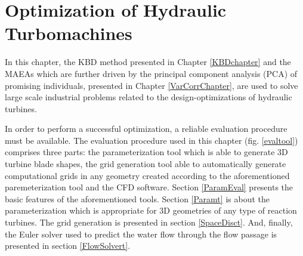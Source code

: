 \ifpdf
    \graphicspath{{5/figures/PNG/}{5/figures/PDF/}{4/figures/}}
\else
    \graphicspath{{5/figures/EPS/}{5/figures/}}
\fi

\chapter{Optimization of Hydraulic Turbomachines} %

In this chapter, the KBD method presented in Chapter \ref{KBDchapter} and the MAEAs which are further driven by the principal component analysis (PCA) of promising individuals, presented in Chapter \ref{VarCorrChapter}, are used to solve large scale industrial problems related to the design-optimizations  of hydraulic turbines. 

In order to perform a successful optimization, a reliable evaluation procedure must be available. The evaluation procedure used in this chapter (fig. \ref{evaltool}) comprises three parts: the parameterization tool which is able to generate 3D turbine blade shapes, the grid generation tool able to automatically generate computational grids in any geometry created according to the aforementioned paremeterization tool and the CFD software. Section \ref{ParamEval} presents the basic features of the aforementioned tools. Section \ref{Paramt} is about the  parameterization  which is appropriate for 3D geometries of any type of reaction turbines. The grid generation is presented in section \ref{SpaceDisct}. And, finally, the Euler solver used to predict the water flow through the flow passage is presented in section \ref{FlowSolvert}.

